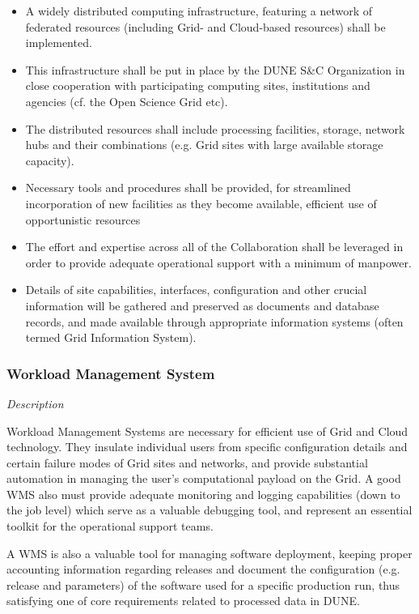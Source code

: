 \begin{itemize}
	\item A widely distributed computing infrastructure, featuring a network of federated resources (including Grid- and Cloud-based resources) shall be implemented.
	
	\item This infrastructure shall be put in place by the DUNE S\&C Organization in close cooperation with participating computing sites, institutions and agencies (cf. the Open Science Grid etc).

	
	\item The distributed resources shall include processing facilities, storage, network hubs and their combinations (e.g. Grid sites with large available storage capacity).
	
	\item Necessary tools and procedures shall be provided, for streamlined incorporation of new facilities as they become available, efficient use of opportunistic resources 
	
	\item The effort and expertise across all of the Collaboration shall be leveraged in order to provide adequate operational support with a minimum of manpower.
	
	\item Details of site capabilities, interfaces, configuration and other crucial information will be gathered and preserved as documents and database records, and made available through appropriate information systems (often termed Grid Information System).
\end{itemize}

\subsubsection{Workload Management System}
\label{sec:req-wms}
\textit{Description}

\noindent Workload Management Systems are necessary for efficient use of Grid and Cloud technology. They insulate individual
users from specific configuration details and certain failure modes of Grid sites and networks, and provide substantial automation
in managing the user's computational payload on the Grid. A good WMS also must provide adequate monitoring and logging capabilities
(down to the job level) which serve as a valuable debugging tool, and represent an essential toolkit for the operational support teams.

A WMS is also a valuable tool for managing software deployment, keeping proper accounting information regarding releases and
document the configuration (e.g. release and parameters) of the software used for a specific production run, thus satisfying one of core
requirements related to processed data in DUNE.
\\ 

